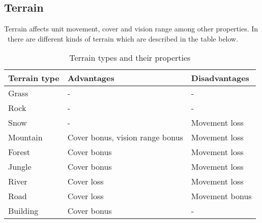 \subsection{Terrain}


Terrain affects unit movement, cover and vision range among other properties.
In \game\ there are different kinds of terrain which are described in the table
below.\\

\begin{table}[H]
    \label{tab:terrain}
    \begin{center}
    \begin{tabular}{| l | m{5cm} | m{5cm} |}
        \hline
        \textbf{Terrain type} & \textbf{Advantages} & \textbf{Disadvantages} \\
        \hline
        Grass & -& - \\
        \hline
        Rock & - & - \\
        \hline
        Snow & - & Movement loss \\
        \hline
        Mountain & Cover bonus, vision range bonus & Movement loss \\
        \hline
        Forest & Cover bonus & Movement loss \\
        \hline
        Jungle & Cover bonus & Movement loss \\
        \hline
        River & Cover loss & Movement loss \\
        \hline
        Road & Cover loss & Movement bonus \\
        \hline
        Building & Cover bonus & - \\
        \hline
    \end{tabular}
    \end{center}
\caption{Terrain types and their properties}
\end{table}



